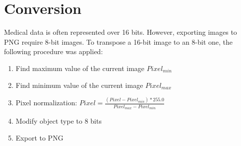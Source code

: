 \section{Conversion}

Medical data is often represented over 16 bits. However, exporting images to PNG require 8-bit images. To transpose a 16-bit image to an 8-bit one, the following procedure was applied:

\begin{enumerate}
	\item Find maximum value of the current image $Pixel_{min}$
	\item Find minimum value of the current image $Pixel_{max}$
	\item Pixel normalization: $Pixel = \frac{(Pixel - Pixel_{min}) * 255.0}{Pixel_{max} - Pixel_{min}}$
	\item Modify object type to 8 bits
	\item Export to PNG
\end{enumerate}